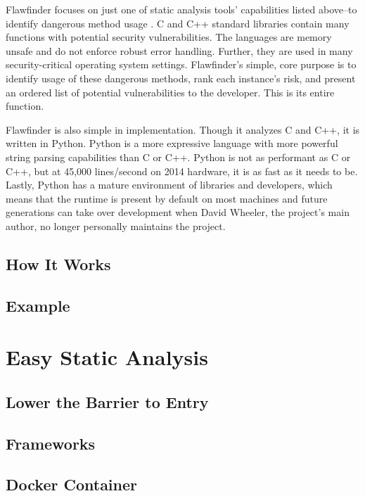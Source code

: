 \documentclass[journal]{IEEEtran}
\begin{document}
Flawfinder focuses on just one of static analysis tools' capabilities listed above--to identify
dangerous method usage \cite{flawfinder}. C and C++ standard libraries contain many functions with
potential security vulnerabilities. The languages are memory unsafe and do not enforce robust error
handling. Further, they are used in many security-critical operating system settings. Flawfinder's
simple, core purpose is to identify usage of these dangerous methods, rank each instance's risk, and
present an ordered list of potential vulnerabilities to the developer. This is its entire function.

Flawfinder is also simple in implementation. Though it analyzes C and C++, it is written in Python.
Python is a more expressive language with more powerful string parsing capabilities than C or C++.
Python is not as performant as C or C++, but at 45,000 lines/second on 2014 hardware, it is as fast
as it needs to be. Lastly, Python has a mature environment of libraries and developers, which means
that the runtime is present by default on most machines and future generations can take over
development when David Wheeler, the project's main author, no longer personally maintains the
project.

\subsection{How It Works}

\subsection{Example}


\section{Easy Static Analysis}

\subsection{Lower the Barrier to Entry}

\subsection{Frameworks}

\subsection{Docker Container}
\end{document}
